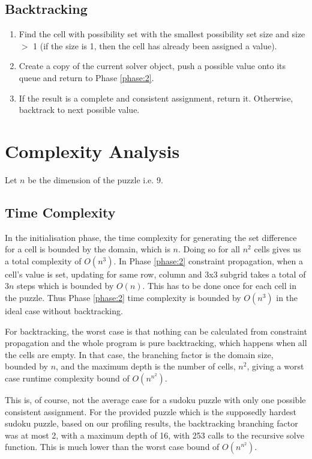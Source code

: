 \documentclass[11pt, a4paper]{article}
\begin{document}
\subsection{Backtracking}
\label{phase:3}
\begin{enumerate}
  \item Find the cell with possibility set with the smallest possibility set size and size $>$ 1 (if the size is 1, then the cell has already been assigned a value).
  \item Create a copy of the current solver object, push a possible value onto its queue and return to Phase \ref{phase:2}.
  \item If the result is a complete and consistent assignment, return it. Otherwise, backtrack to next possible value.
\end{enumerate}

\section{Complexity Analysis}
Let $n$ be the dimension of the puzzle i.e. 9.

\subsection{Time Complexity}
In the initialisation phase, the time complexity for generating the set difference for a cell is bounded by the domain, which is $n$.
Doing so for all $n^2$ cells gives us a total complexity of $O(n^3)$.
In Phase \ref{phase:2} constraint propagation, when a cell's value is set, updating for same row, column and 3x3 subgrid takes a total of $3n$ steps which is bounded by $O(n)$.
This has to be done once for each cell in the puzzle.
Thus Phase \ref{phase:2} time complexity is bounded by $O(n^3)$ in the ideal case without backtracking.

For backtracking, the worst case is that nothing can be calculated from constraint propagation and the whole program is pure backtracking, which happens when all the cells are empty.
In that case, the branching factor is the domain size, bounded by $n$, and the maximum depth is the number of cells, $n^2$, giving a worst case runtime complexity bound of $O(n^{n^2})$.

This is, of course, not the average case for a sudoku puzzle with only one possible consistent assignment.
For the provided puzzle which is the supposedly hardest sudoku puzzle, based on our profiling results, the backtracking branching factor was at most 2, with a maximum depth of 16, with 253 calls to the recursive solve function.
This is much lower than the worst case bound of $O(n^{n^2})$.
\end{document}
